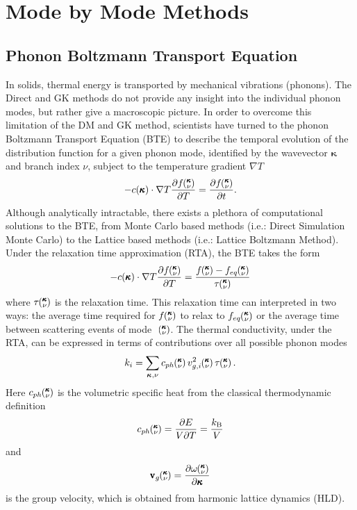 \section{Mode by Mode Methods}
\subsection{Phonon Boltzmann Transport Equation}
%
In solids, thermal energy is transported by mechanical vibrations (phonons). The Direct and GK methods do not provide any insight into the individual phonon modes, but rather give a macroscopic picture. In order to overcome this limitation of the DM and GK method, scientists have turned to the phonon Boltzmann Transport Equation (BTE) to describe the temporal evolution of the distribution function for a given phonon mode, identified by the wavevector $\pmb{\kappa}$ and branch index $\nu$, subject to the temperature gradient $\nabla T$ \cite{srivastava1990physics} 
%
\begin{equation}\label{EQ:BTE}
-c(\pmb{\kappa})\cdot \nabla T\frac{\partial f\kv}{\partial T}=\frac{\partial f\kv}{\partial t}.
\end{equation}
%
Although analytically intractable, there exists a plethora of computational solutions to the BTE, from Monte Carlo based methods (i.e.: Direct Simulation Monte Carlo)\cite{mazumder2001monte} to the Lattice based methods (i.e.: Lattice Boltzmann Method)\cite{nabovati2011lattice}. Under the relaxation time approximation (RTA), the BTE takes the form
%
\begin{equation}\label{EQ:BTE_lin}
-c(\pmb{\kappa})\cdot \nabla T\frac{\partial f\kv}{\partial T}=\frac{f\kv-f_{eq}\kv}{\tau \kv}
\end{equation}
%
where $\tau \kv$ is the relaxation time. This relaxation time can interpreted in two ways: the average time required for $f\kv$ to relax to $f_{eq}\kv$ or the average time between scattering events of mode ~$\kv$. The thermal conductivity, under the RTA, can be expressed in terms of contributions over all possible phonon modes \cite{srivastava1990physics}
%
\begin{equation}\label{EQ:k_RTA}
	k_{i}= \sum_{\bm{\kappa},\nu} c_{ph}\kv v^2_{g,i}\kv\tau\kv.
\end{equation}
%
Here $c_{ph}\kv$ is the volumetric specific heat from the classical thermodynamic definition \cite{mcgaugheythesis}
%
\begin{equation}\label{EQ:Cph}
c_{ph}\kv=\frac{\partial E}{V\partial T}=\frac{k_\mathrm{B}}{V}
\end{equation}
%
and
\begin{equation}\label{EQ:Vg}
\pmb{\mathrm{v}}_{g}\kv=\frac{\partial \omega \kv}{\partial \pmb{\kappa}}
\end{equation}
is the group velocity, which is obtained from harmonic lattice dynamics (HLD).

